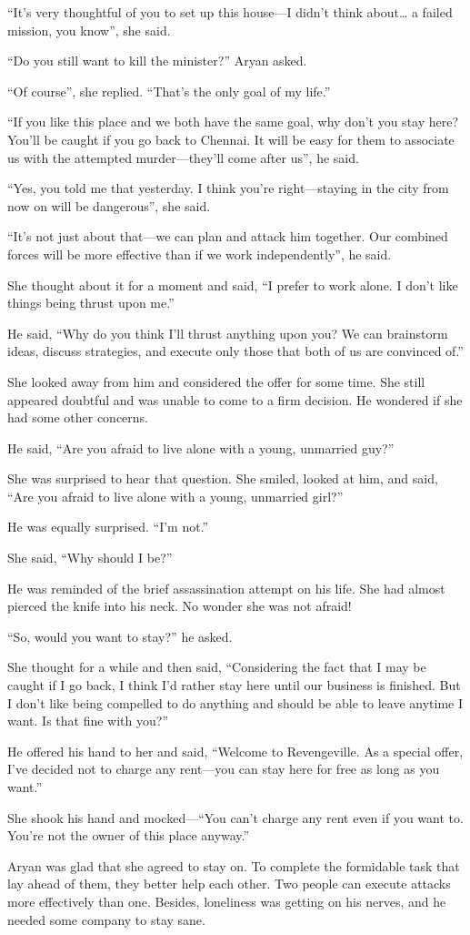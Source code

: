 “It's very thoughtful of you to set up this house—I didn't think about…
a failed mission, you know”, she said.

“Do you still want to kill the minister?” Aryan asked.

“Of course”, she replied. “That's the only goal of my life.”

“If you like this place and we both have the same goal, why don't you stay
here? You'll be caught if you go back to Chennai. It will be easy for them to
associate us with the attempted murder—they'll come after us”, he said.

“Yes, you told me that yesterday. I think you're right—staying in the city
from now on will be dangerous”, she said.

“It's not just about that—we can plan and attack him together. Our combined
forces will be more effective than if we work independently”, he said.

She thought about it for a moment and said, “I prefer to work alone. I don't
like things being thrust upon me.”

He said, “Why do you think I'll thrust anything upon you? We can brainstorm
ideas, discuss strategies, and execute only those that both of us are convinced
of.”

She looked away from him and considered the offer for some time. She still
appeared doubtful and was unable to come to a firm decision. He wondered if she
had some other concerns.

He said, “Are you afraid to live alone with a young, unmarried guy?”

She was surprised to hear that question. She smiled, looked at him, and said,
“Are you afraid to live alone with a young, unmarried girl?”

He was equally surprised. “I'm not.”

She said, “Why should I be?”

He was reminded of the brief assassination attempt on his life. She had almost
pierced the knife into his neck. No wonder she was not afraid!

“So, would you want to stay?” he asked.

She thought for a while and then said, “Considering the fact that I may be
caught if I go back, I think I'd rather stay here until our business is
finished. But I don't like being compelled to do anything and should be able
to leave anytime I want. Is that fine with you?”

He offered his hand to her and said, “Welcome to Revengeville. As a special
offer, I've decided not to charge any rent—you can stay here for free as
long as you want.”

She shook his hand and mocked—“You can't charge any rent even if you
want to. You're not the owner of this place anyway.”

Aryan was glad that she agreed to stay on. To complete the formidable task that
lay ahead of them, they better help each other. Two people can execute attacks
more effectively than one. Besides, loneliness was getting on his nerves, and he
needed some company to stay sane.